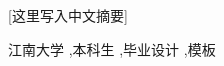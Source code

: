 \jnabstract[zh]   %


[这里写入中文摘要]




\begin{jnkeywords}
江南大学 \sep 本科生 \sep 毕业设计 \sep \XeLaTeX 模板
\end{jnkeywords}

